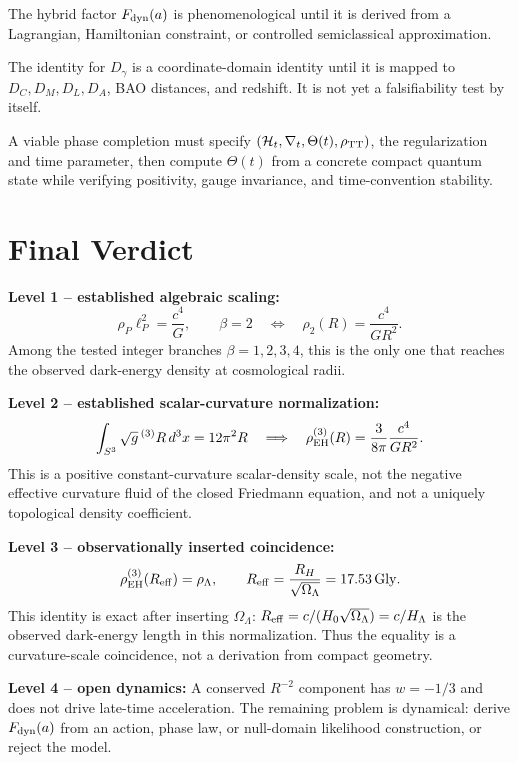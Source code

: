 \documentclass[11pt,a4paper]{article}
\newcommand{\RH}{R_H}
\newcommand{\Reff}{R_{\rm eff}}
\newcommand{\OmL}{\Omega_\Lambda}
\newcommand{\Gly}{\mathrm{Gly}}
\begin{document}
\begin{openpbox}
The hybrid factor $F_{\rm dyn}(a)$ is phenomenological until it is derived from a
Lagrangian, Hamiltonian constraint, or controlled semiclassical approximation.
\end{openpbox}

\begin{openpbox}
The identity for $D_\gamma$ is a coordinate-domain identity until it is mapped to
$D_C,D_M,D_L,D_A$, BAO distances, and redshift.  It is not yet a falsifiability
test by itself.
\end{openpbox}

\begin{openpbox}
A viable phase completion must specify $(\mathcal H_t,\nabla_t,\Theta(t),
\rho_{\rm TT})$, the regularization and time parameter, then compute
$\Theta(t)$ from a concrete compact quantum state while verifying positivity,
gauge invariance, and time-convention stability.
\end{openpbox}

\section{Final Verdict}
\label{sec:verdict}

\begin{tcolorbox}[colback=green!4,colframe=falsecol,fonttitle=\bfseries\large,
  title=Four-Level Verdict,boxrule=1.0pt,arc=4pt]
\textbf{Level 1 -- established algebraic scaling:}
\[
\rho_P\ell_P^2=\frac{c^4}{G},
\qquad
\beta=2 \quad\Longleftrightarrow\quad
\rho_2(R)=\frac{c^4}{G R^2}.
\]
Among the tested integer branches $\beta=1,2,3,4$, this is the only one that
reaches the observed dark-energy density at cosmological radii.

\medskip
\textbf{Level 2 -- established scalar-curvature normalization:}
\[
\int_{S^3}\sqrt{g}\,{}^{(3)}R\,d^3x=12\pi^2R
\quad\Longrightarrow\quad
\rho_{\rm EH}^{(3)}(R)=\frac{3}{8\pi}\frac{c^4}{GR^2}.
\]
This is a positive constant-curvature scalar-density scale, not the negative
effective curvature fluid of the closed Friedmann equation, and not a uniquely
topological density coefficient.

\medskip
\textbf{Level 3 -- observationally inserted coincidence:}
\[
\rho_{\rm EH}^{(3)}(\Reff)=\rho_\Lambda,
\qquad
\Reff=\frac{\RH}{\sqrt{\OmL}}=17.53\,\Gly.
\]
This identity is exact after inserting $\OmL$: $\Reff=c/(H_0\sqrt{\OmL})=c/H_\Lambda$
is the observed dark-energy length in this normalization.  Thus the equality is a
curvature-scale coincidence, not a derivation from compact geometry.

\medskip
\textbf{Level 4 -- open dynamics:}
A conserved $R^{-2}$ component has $w=-1/3$ and does not drive late-time
acceleration.  The remaining problem is dynamical: derive $F_{\rm dyn}(a)$ from
an action, phase law, or null-domain likelihood construction, or reject the
model.
\end{tcolorbox}
\end{document}
